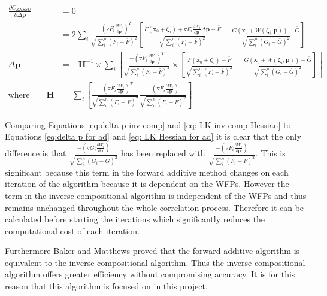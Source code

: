 \documentclass[12pt,oneside,openany,a4paper, %
english, %
masters-t, goldenblock]{usthesis}
\newcommand*\mean[1]{\bar{#1}} %
\begin{document}
\begin{align}
  \frac{\partial C_{ZNSSD}}{\partial \Delta \bm{p}} &= 0 \nonumber \\
  &= 2 \sum_{i} \frac{-(\triangledown F_i \frac{\partial W_i}{\partial \bm{p}})^T}{\sqrt{\sum_i^n (F_i-\mean{F})^2}} \left[ \frac{F(\bm{x}_0+\bm{\zeta}_i)+\triangledown F_i \frac{\partial W_i}{\partial \bm{p}} \Delta\bm{p}-\mean{F}}{\sqrt{\sum_i^n (F_i-\mean{F})^2}} -\frac{G(\bm{x}_0+W(\bm{\zeta}_i,\bm{p}))-\mean{G}}{\sqrt{\sum_i^n (G_i-\mean{G})^2}}\right] \\
  \Delta \bm{p} &= - \bm{H}^{-1} \times \sum_{i} \left[ \frac{-(\triangledown F_i \frac{\partial W_i}{\partial \bm{p}})^T}{\sqrt{\sum_i^n (F_i-\mean{F})^2}} \times \left[ \frac{F(\bm{x}_0 + \bm{\zeta}_i) - \mean{F}}{\sqrt{\sum_i^n (F_i-\mean{F})^2}} - \frac{G(\bm{x}_0+W(\bm{\zeta}_i, \bm{p}))-\mean{G}}{\sqrt{\sum_i^n (G_i-\mean{G})^2}} \right] \right]
  \label{eq:delta p inv comp} \\
  \text{where} \qquad \bm{H} &= \sum_{i} \left[ \frac{-(\triangledown F_i \frac{\partial W_i}{\partial \bm{p}})^T}{\sqrt{\sum_i^n (F_i-\mean{F})^2}} \frac{-(\triangledown F_i \frac{\partial W_i}{\partial \bm{p}})}{\sqrt{\sum_i^n (F_i-\mean{F})^2}} \right] \label{eq: LK inv comp Hessian}
\end{align}

Comparing Equations \ref{eq:delta p inv comp} and \ref{eq: LK inv comp Hessian} to Equations \ref{eq:delta p for ad} and \ref{eq: LK Hessian for ad} it is clear that the only difference is that $\frac{- (\triangledown G_i \frac{\partial W_i}{\partial \bm{p}})}{\sqrt{\sum_i^n (G_i-\mean{G})^2}}$ has been replaced with $\frac{-(\triangledown F_i \frac{\partial W_i}{\partial \bm{p}})}{\sqrt{\sum_i^n (F_i-\mean{F})^2}}$. This is significant because this term in the forward additive method changes on each iteration of the algorithm because it is dependent on the WFPs. However the term in the inverse compositional algorithm is independent of the WFPs and thus remains unchanged throughout the whole correlation process. Therefore it can be calculated before starting the iterations which significantly reduces the computational cost of each iteration. 

Furthermore Baker and Matthews \cite{lucasUnifying} proved that the forward additive algorithm is equivalent to the inverse compositional algorithm. Thus the inverse compositional algorithm offers greater efficiency without compromising accuracy. It is for this reason that this algorithm is focused on in this project.
\end{document}
